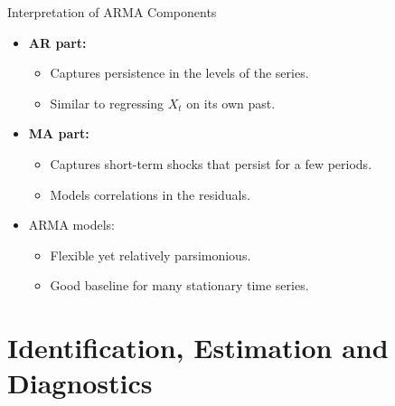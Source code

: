 \documentclass{beamer}
\begin{document}
\begin{frame}{Interpretation of ARMA Components}
  \begin{itemize}
    \item \textbf{AR part:}
      \begin{itemize}
        \item Captures persistence in the levels of the series.
        \item Similar to regressing $X_t$ on its own past.
      \end{itemize}
    \item \textbf{MA part:}
      \begin{itemize}
        \item Captures short-term shocks that persist for a few periods.
        \item Models correlations in the residuals.
      \end{itemize}
    \item ARMA models:
      \begin{itemize}
        \item Flexible yet relatively parsimonious.
        \item Good baseline for many stationary time series.
      \end{itemize}
  \end{itemize}
\end{frame}

\section{Identification, Estimation and Diagnostics}
\end{document}
